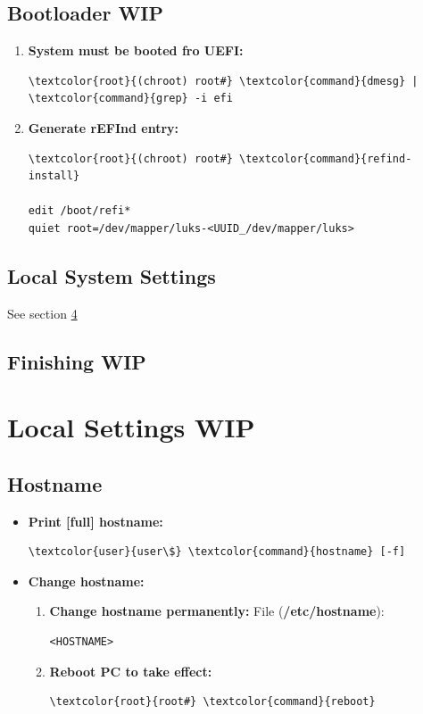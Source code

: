 \documentclass[10pt, a4paper, onecolumn, oneside, titlepage, openany]{book}
\begin{document}
\section{Bootloader WIP}
\begin{enumerate}
    \item \textbf{System must be booted fro UEFI:}
\begin{Verbatim}[commandchars=\\\{\}]
\textcolor{root}{(chroot) root#} \textcolor{command}{dmesg} | \textcolor{command}{grep} -i efi
\end{Verbatim}
    \item \textbf{Generate rEFInd entry:}
\begin{Verbatim}[commandchars=\\\{\}]
\textcolor{root}{(chroot) root#} \textcolor{command}{refind-install}

edit /boot/refi*
quiet root=/dev/mapper/luks-<UUID_/dev/mapper/luks>

\end{Verbatim}
\end{enumerate}

\section{Local System Settings}
See section \ref{section:local_settings}

\section{Finishing WIP}


\chapter{Local Settings WIP}
\label{section:local_settings}
\section{Hostname}
\begin{itemize}
    \item \textbf{Print [full] hostname:}
\begin{Verbatim}[commandchars=\\\{\}]
\textcolor{user}{user\$} \textcolor{command}{hostname} [-f]
\end{Verbatim}
    \item \textbf{Change hostname:}
    \begin{enumerate}
        \item \textbf{Change hostname permanently:}
\newline File (\textbf{\textcolor{file}{/etc/hostname}}):
\begin{verbatim}
<HOSTNAME>
\end{verbatim}
    \item \textbf{Reboot PC to take effect:}
\begin{Verbatim}[commandchars=\\\{\}]
\textcolor{root}{root#} \textcolor{command}{reboot}
\end{Verbatim}
    \end{enumerate}
\end{itemize}
\end{document}
